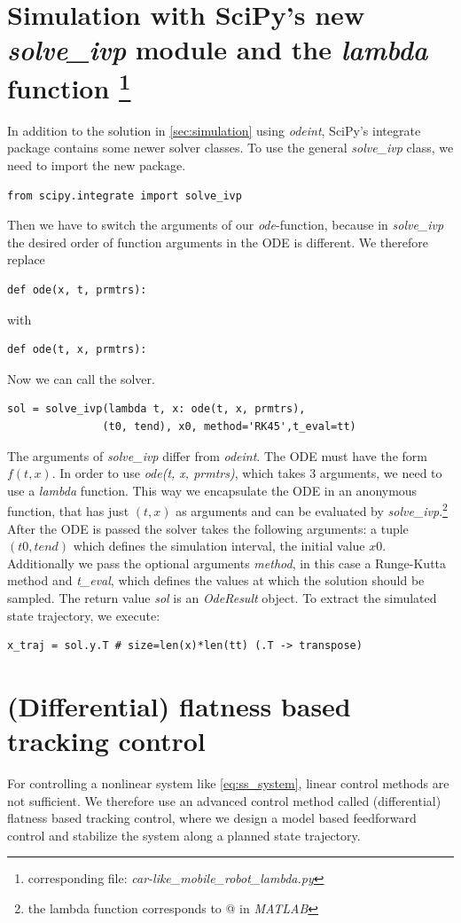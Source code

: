 \documentclass[a4paper,11pt,headings=standardclasses]{scrartcl}%
\begin{document}
\section[Simulation with SciPy's new \emph{solve\_ivp} module and the \emph{lambda} function]{Simulation with SciPy's new \emph{solve\_ivp} module and the \emph{lambda} function \protect \footnote{corresponding file: \emph{car-like\_mobile\_robot\_lambda.py}}}
In addition to the solution in \autoref{sec:simulation} using \emph{odeint}, SciPy's integrate package contains some newer solver classes. To use the general \emph{solve\_ivp} class, we need to import the new package.
\begin{lstlisting}
from scipy.integrate import solve_ivp
\end{lstlisting}
Then we have to switch the arguments of our \emph{ode}-function, because in \emph{solve\_ivp} the desired order of function arguments in the ODE is different. We therefore replace
\begin{lstlisting}
def ode(x, t, prmtrs):
\end{lstlisting}
with 
\begin{lstlisting}
def ode(t, x, prmtrs):
\end{lstlisting}
Now we can call the solver.
\begin{lstlisting}
sol = solve_ivp(lambda t, x: ode(t, x, prmtrs), 
               (t0, tend), x0, method='RK45',t_eval=tt)
\end{lstlisting}
The arguments of \emph{solve\_ivp} differ from \emph{odeint}. The ODE must have the form $f(t,x)$. In order to use \emph{ode(t, x, prmtrs)}, which takes 3 arguments, we need to use a \emph{lambda} function. This way we encapsulate the ODE in an anonymous function, that has just $(t, x)$ as arguments and can be evaluated by \emph{solve\_ivp}.\footnote{the lambda function corresponds to @ in \emph{MATLAB}} After the ODE is passed the solver takes the following arguments: a tuple $(t0, tend)$ which defines the simulation interval, the initial value $x0$. Additionally we pass the optional arguments \emph{method}, in this case a Runge-Kutta method and \emph{t\_eval}, which defines the values at which the solution should be sampled. 
The return value \emph{sol} is an \emph{OdeResult} object. To extract the simulated state trajectory, we execute:
\begin{lstlisting}
x_traj = sol.y.T # size=len(x)*len(tt) (.T -> transpose)
\end{lstlisting}

\newpage
\section{(Differential) flatness based tracking control}
For controlling a nonlinear system like \eqref{eq:ss_system}, linear control methods are not sufficient. We therefore use an advanced control method called (differential) flatness based tracking control, where we design a model based feedforward control and stabilize the system along a planned state trajectory.
\end{document}
